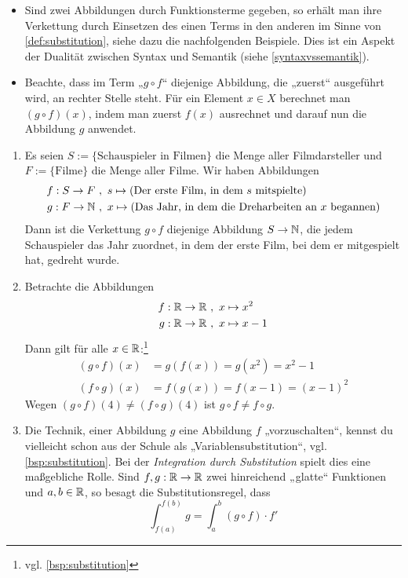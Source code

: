 \begin{bem} \quad
    \begin{itemize}
        \item Sind zwei Abbildungen durch Funktionsterme gegeben, so erhält man ihre Verkettung durch Einsetzen des einen Terms in den anderen im Sinne von \cref{def:substitution}, siehe dazu die nachfolgenden Beispiele. Dies ist ein Aspekt der Dualität zwischen Syntax und Semantik (siehe \cref{syntaxvssemantik}).
        \item Beachte, dass im Term „$g\circ f$“ diejenige Abbildung, die „zuerst“ ausgeführt wird, an rechter Stelle steht. Für ein Element $x \in X$ berechnet man $(g\circ f)(x)$, indem man zuerst $f(x)$ ausrechnet und darauf nun die Abbildung $g$ anwendet.
    \end{itemize}
\end{bem}


\begin{bsp} \label{bsp:verkettung} \quad
    \begin{enumerate}
        \item Es seien $S:= \{ \text{Schauspieler in Filmen}\}$ die Menge aller Filmdarsteller und $F:=\{\text{Filme}\}$ die Menge aller Filme. Wir haben Abbildungen
        \begin{align*}
            f : S \to F \ & ,\ s\mapsto (\text{Der erste Film, in dem $s$ mitspielte}) \\
            g : F \to \mathbb N \ & ,\ x \mapsto (\text{Das Jahr, in dem die Dreharbeiten an $x$ begannen})
        \end{align*}
        Dann ist die Verkettung $g\circ f$ diejenige Abbildung $S\to \mathbb N$, die jedem Schauspieler das Jahr zuordnet, in dem der erste Film, bei dem er mitgespielt hat, gedreht wurde.
        \item Betrachte die Abbildungen
        \begin{align*}
            f : \mathbb R \to \mathbb R \ &,\ x\mapsto x^2 \\
            g : \mathbb R \to \mathbb R \ &,\ x \mapsto x-1
        \end{align*}
        Dann gilt für alle $x\in \mathbb R$:\footnote{vgl. \cref{bsp:substitution}}
        \begin{align*}
            (g\circ f)(x) & = g(f(x)) = g(x^2) = x^2-1 \\
            (f\circ g)(x) & = f(g(x)) = f(x-1) = (x-1)^2
        \end{align*}
        Wegen $(g\circ f)(4)\neq (f\circ g)(4)$ ist $g\circ f\neq f\circ g$.
        \item Die Technik, einer Abbildung $g$ eine Abbildung $f$ „vorzuschalten“, kennst du vielleicht schon aus der Schule als „Variablensubstitution“, vgl. \cref{bsp:substitution}. Bei der \emph{Integration durch Substitution} spielt dies eine maßgebliche Rolle. Sind $f,g:\mathbb R\to \mathbb R$ zwei hinreichend „glatte“ Funktionen und $a,b\in \mathbb R$, so besagt die Substitutionsregel, dass
        \[ \int_{f(a)}^{f(b)} g = \int_a^b (g\circ f) \cdot f' \]
    \end{enumerate}
\end{bsp}


